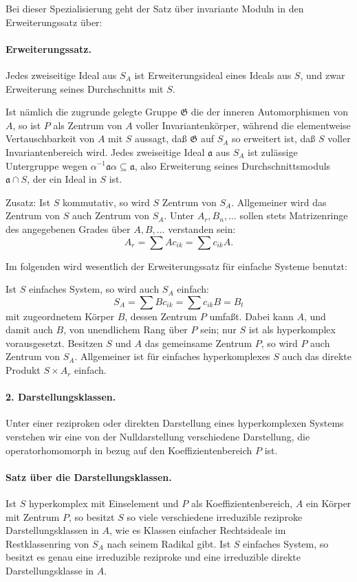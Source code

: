 \documentclass[11pt]{article}
\providecommand{\frG}{\mathfrak G}
\begin{document}
Bei dieser Spezialisierung geht der Satz über invariante Moduln in den Erweiterungssatz über:

\paragraph{Erweiterungssatz.}
Jedes zweiseitige Ideal aus \(S_A\) ist Erweiterungsideal eines Ideals aus \(S\), und zwar Erweiterung seines Durchschnitts mit \(S\).

Ist nämlich die zugrunde gelegte Gruppe \(\frG\) die der inneren Automorphismen von \(A\), so ist \(P\) als Zentrum von \(A\) voller Invariantenkörper, während die elementweise Vertauschbarkeit von \(A\) mit \(S\) aussagt, daß \(\frG\) auf \(S_A\) so erweitert ist, daß \(S\) voller Invariantenbereich wird. Jedes zweiseitige Ideal \(\mathfrak a\) aus \(S_A\) ist zulässige Untergruppe wegen \(\alpha^{-1}\mathfrak a\alpha\subseteq\mathfrak a\), also Erweiterung seines Durchschnittsmoduls \(\mathfrak a\cap S\), der ein Ideal in \(S\) ist.

Zusatz: Ist \(S\) kommutativ, so wird \(S\) Zentrum von \(S_A\). Allgemeiner wird das Zentrum von \(S\) auch Zentrum von \(S_A\). Unter \(A_r,B_n,\ldots\) sollen stets Matrizenringe des angegebenen Grades über \(A,B,\ldots\) verstanden sein:
\[
        A_r=\sum A c_{ik}=\sum c_{ik}A.
\]

Im folgenden wird wesentlich der Erweiterungssatz für einfache Systeme benutzt:

Ist \(S\) einfaches System, so wird auch \(S_A\) einfach:
\[
        S_A=\sum B c_{ik}=\sum c_{ik}B=B_t
\]
mit zugeordnetem Körper \(B\), dessen Zentrum \(P\) umfaßt. Dabei kann \(A\), und damit auch \(B\), von unendlichem Rang über \(P\) sein; nur \(S\) ist als hyperkomplex vorausgesetzt. Besitzen \(S\) und \(A\) das gemeinsame Zentrum \(P\), so wird \(P\) auch Zentrum von \(S_A\). Allgemeiner ist für einfaches hyperkomplexes \(S\) auch das direkte Produkt \(S\times A_r\) einfach.

\paragraph{2. Darstellungsklassen.}
Unter einer reziproken oder direkten Darstellung eines hyperkomplexen Systems verstehen wir eine von der Nulldarstellung verschiedene Darstellung, die operatorhomomorph in bezug auf den Koeffizientenbereich \(P\) ist.

\paragraph{Satz über die Darstellungsklassen.}
Ist \(S\) hyperkomplex mit Einselement und \(P\) als Koeffizientenbereich, \(A\) ein Körper mit Zentrum \(P\), so besitzt \(S\) so viele verschiedene irreduzible reziproke Darstellungsklassen in \(A\), wie es Klassen einfacher Rechtsideale im Restklassenring von \(S_A\) nach seinem Radikal gibt. Ist \(S\) einfaches System, so besitzt es genau eine irreduzible reziproke und eine irreduzible direkte Darstellungsklasse in \(A\).
\end{document}
